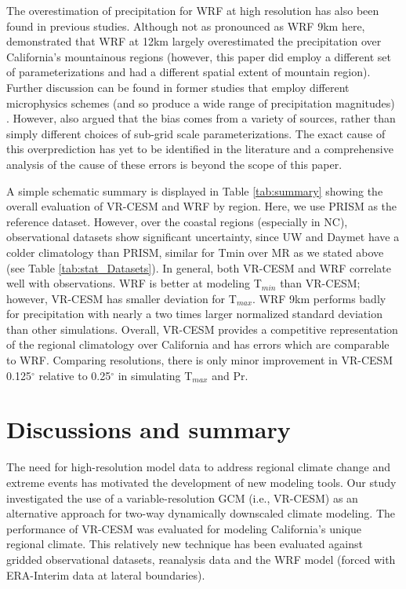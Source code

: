 \documentclass[draft,ms]{agutex}   %
\begin{document}
\begin{article}
The overestimation of precipitation for WRF at high resolution has also been found in previous studies. Although not as pronounced as WRF 9km here, \citet{caldwell2009evaluation} demonstrated that WRF at 12km largely overestimated the precipitation over California's mountainous regions (however, this paper did employ a different set of parameterizations and had a different spatial extent of mountain region). Further discussion can be found in former studies that employ different microphysics schemes (and so produce a wide range of precipitation magnitudes) \citep{jankov2005impact, chin2010preliminary, caldwell2010california}. However, \citet{caldwell2009evaluation} also argued that the bias comes from a variety of sources, rather than simply different choices of sub-grid scale parameterizations. The exact cause of this overprediction has yet to be identified in the literature and a comprehensive analysis of the cause of these errors is beyond the scope of this paper. 

A simple schematic summary is displayed in Table \ref{tab:summary} showing the overall evaluation of VR-CESM and WRF by region. Here, we use PRISM as the reference dataset. However, over the coastal regions (especially in NC), observational datasets show significant uncertainty, since UW and Daymet have a colder climatology than PRISM, similar for Tmin over MR as we stated above (see Table \ref{tab:stat_Datasets}). In general, both VR-CESM and WRF correlate well with observations. WRF is better at modeling T$_{min}$ than VR-CESM; however, VR-CESM has smaller deviation for T$_{max}$. WRF 9km performs badly for precipitation with nearly a two times larger normalized standard deviation than other simulations. Overall, VR-CESM provides a competitive representation of the regional climatology over California and has errors which are comparable to WRF. Comparing resolutions, there is only minor improvement in VR-CESM 0.125$^\circ$ relative to 0.25$^\circ$ in simulating T$_{max}$ and Pr.

\section{Discussions and summary}

The need for high-resolution model data to address regional climate change and extreme events has motivated the development of new modeling tools.  Our study investigated the use of a variable-resolution GCM (i.e., VR-CESM) as an alternative approach for two-way dynamically downscaled climate modeling. The performance of VR-CESM was evaluated for modeling California's unique regional climate. This relatively new technique has been evaluated against gridded observational datasets, reanalysis data and the WRF model (forced with ERA-Interim data at lateral boundaries).


\end{article}
\end{document}
